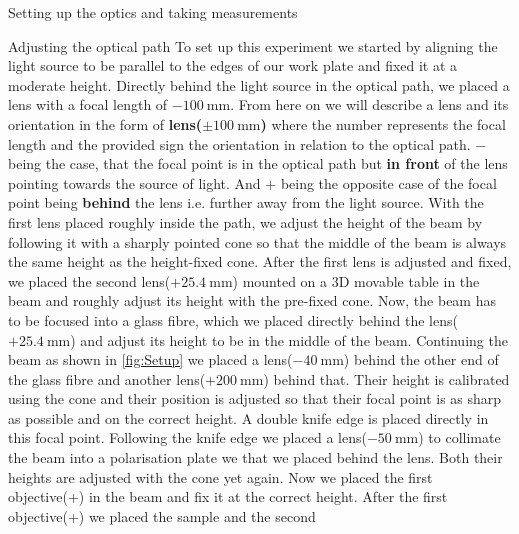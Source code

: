 \documentclass[pdftex, a4paper,11pt, twoside, UKenglish]{report}
\begin{document}
\begin{chapter}{Setting up the optics and taking measurements}
    \newpage
    \begin{section}{Adjusting the optical path}
      \label{chp:SetupOptics}
      To set up this experiment we started by aligning the light source to be
      parallel to the edges of our work plate and fixed it at a moderate height.
      Directly behind the light source in the optical path, we placed a lens
      with a focal length of $\SI{-100}{\milli\meter}$. \newline
      From here on we will describe a lens and its orientation in the form of
      \textbf{lens($\pm \SI{100}{\milli\meter}$)} where the number
      represents the focal length and the provided sign the orientation in
      relation to the optical path. $-$ being the case, that the focal point is
      in the optical path but \textbf{in front} of the lens pointing towards the
      source of light. And $+$ being the opposite case of the focal point being
      \textbf{behind} the lens i.e. further away from the light source. \newline
      With the first lens placed roughly inside the path, we adjust the height
      of the beam by following it with a sharply pointed cone so that the middle
      of the beam is always the same height as the height-fixed cone.
      After the first lens is adjusted and fixed, we placed the second 
      lens($+\SI{25.4}{\milli\meter}$) mounted on a 3D movable table in the beam
      and roughly adjust its height with the pre-fixed cone.
      Now, the beam has to be focused into a glass fibre, which we placed
      directly behind the lens($+\SI{25.4}{\milli\meter}$) and adjust its height
      to be in the middle of the beam. Continuing the beam as shown in
      \cref{fig:Setup} we placed a lens($\SI{-40}{\milli\meter}$) behind the
      other end of the glass fibre and another lens($+\SI{200}{\milli\meter}$)
      behind that. Their height is calibrated using the cone and their position
      is adjusted so that their focal point is as sharp as possible and on the
      correct height.
      A double knife edge is placed directly in this focal point.\newline
      Following the knife edge we placed a lens($\SI{-50}{\milli\meter}$) to
      collimate the beam into a polarisation plate we that we placed behind the
      lens. Both their heights are adjusted with the cone yet again.
      Now we placed the first objective(+) in the beam and fix it at the correct
      height. After the first objective(+) we placed the sample and the second

\end{section}
\end{chapter}
\end{document}
